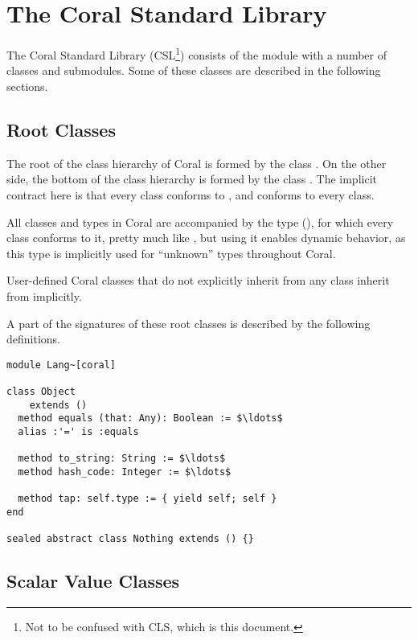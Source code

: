 
\chapter{The Coral Standard Library}

The Coral Standard Library (CSL\footnote{Not to be confused with CLS, which is this document.}) consists of the module  with a number of classes and submodules. Some of these classes are described in the following sections. 

\section{Root Classes}
\label{sec:root-classes}

The root of the class hierarchy of Coral is formed by the class . On the other side, the bottom of the class hierarchy is formed by the class . The implicit contract here is that every class conforms to , and  conforms to every class. 

All classes and types in Coral are accompanied by the  type (), for which every class conforms to it, pretty much like , but using it enables dynamic behavior, as this type is implicitly used for ``unknown'' types throughout Coral. 

User-defined Coral classes that do not explicitly inherit from any class inherit from  implicitly. 

A part of the signatures of these root classes is described by the following definitions. 

\begin{lstlisting}
module Lang~[coral]

class Object 
    extends ()
  method equals (that: Any): Boolean := $\ldots$
  alias :'=' is :equals
  
  method to_string: String := $\ldots$
  method hash_code: Integer := $\ldots$
  
  method tap: self.type := { yield self; self }
end

sealed abstract class Nothing extends () {}
\end{lstlisting}






\section{Scalar Value Classes}
\label{sec:scalar-value-classes}

